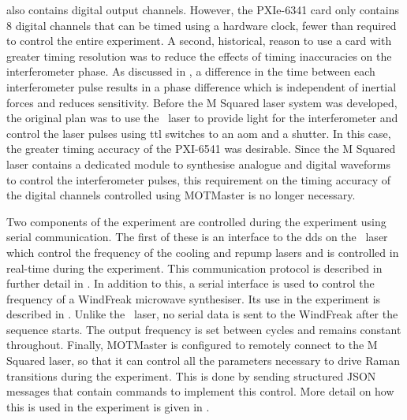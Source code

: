 also contains digital output channels. However, the PXIe-6341 card only
contains 8 digital channels that can be timed using a hardware clock, fewer
than required to control the entire experiment. A second, historical, reason
to use a card with greater timing resolution was to reduce the effects of
timing inaccuracies on the interferometer phase. As discussed in
, a difference in the time between each
interferometer pulse results in a phase difference which is independent of
inertial forces and reduces sensitivity. Before the M Squared laser system
was developed, the original plan was to use the \Muquans\ laser to provide
light for the interferometer and control the laser pulses using \ac{ttl}
switches to an \ac{aom} and a shutter. In this case, the greater timing
accuracy of the PXI-6541 was desirable. Since the M Squared laser contains a
dedicated module to synthesise analogue and digital waveforms to control the
interferometer pulses, this requirement on the timing accuracy of the digital
channels controlled using MOTMaster is no longer necessary. \par\noindent
Two components of the experiment are controlled during the experiment using
serial communication. The first of these is an interface to the \ac{dds} on
the \Muquans\ laser which control the frequency of the cooling and repump
lasers and is controlled in real-time during the experiment. This
communication protocol is described in further detail in
. In addition to this, a serial interface is
used to control the frequency of a WindFreak microwave synthesiser. Its use
in the experiment is described in . Unlike the
\Muquans\ laser, no serial data is sent to the WindFreak after the sequence
starts. The output frequency is set between cycles and remains constant
throughout. Finally, MOTMaster is configured to remotely connect to the M
Squared laser, so that it can control all the parameters necessary to drive
Raman transitions during the experiment. This is done by sending structured
JSON messages that contain commands to implement this control. More detail on
how this is used in the experiment is given in
.